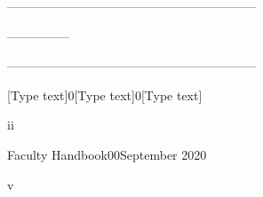 \documentclass[letterpaper, 11pt]{article}
\begin{document}
	------------------------------------------------------------

	---------------

	------------------------------------------------------------

	[Type text]0[Type text]0[Type text]







	ii


	Faculty Handbook00September 2020

	v




	
	
\end{document}

